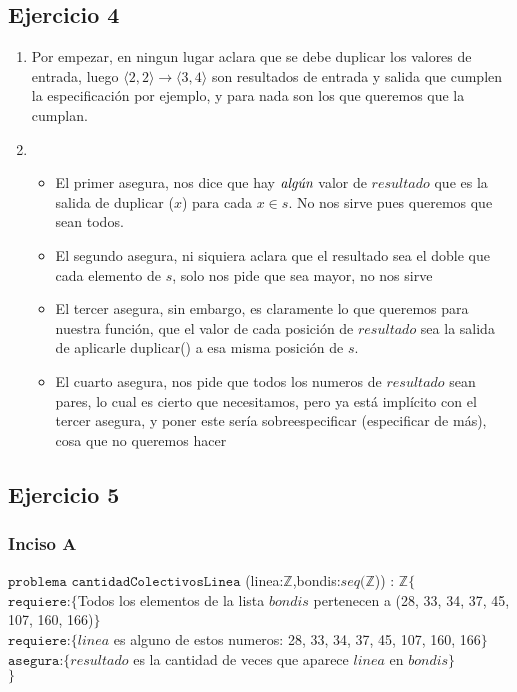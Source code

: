 	\subsection{Ejercicio 4}
	\begin{enumerate}[label=(\alph*)]
	\item Por empezar, en ningun lugar aclara que se debe duplicar los valores de entrada, luego $\langle 2,2 \rangle \rightarrow \langle 3,4 \rangle$ son resultados de entrada y salida que cumplen la especificación por ejemplo, y para nada son los que queremos que la cumplan.
	\item 
	\begin{itemize}
		\item El primer asegura, nos dice que hay $\emph{algún}$ valor de $resultado$ que es la salida de duplicar ($x$) para cada $x\in s$. No nos sirve pues queremos que sean todos.
		\item El segundo asegura, ni siquiera aclara que el resultado sea el doble que cada elemento de $s$, solo nos pide que sea mayor, no nos sirve
		\item El tercer asegura, sin embargo, es claramente lo que queremos para nuestra función, que el valor de cada posición de $resultado$ sea la salida de aplicarle duplicar() a esa misma posición de $s$.
		\item El cuarto asegura, nos pide que todos los numeros de $resultado$ sean pares, lo cual es cierto que necesitamos, pero ya está implícito con el tercer asegura, y poner este sería sobreespecificar (especificar de más), cosa que no queremos hacer
	\end{itemize}
	\end{enumerate}
	
	\subsection{Ejercicio 5}
	\subsubsection{Inciso A}
	$\texttt{problema cantidadColectivosLinea}$ (linea:$\mathbb{Z}$,bondis:$seq(\mathbb{Z}$)) : $\mathbb{Z}\lbrace$ \\
	$\texttt{requiere}$:$\lbrace$Todos los elementos de la lista $bondis$ pertenecen a (28, 33, 34, 37, 45, 107, 160, 166)$\rbrace$\\
	$\texttt{requiere}$:$\lbrace$$linea$ es alguno de estos numeros: 28, 33, 34, 37, 45, 107, 160, 166$\rbrace$\\
	$\texttt{asegura}$:$\lbrace$$resultado$ es la cantidad de veces que aparece $linea$ en $bondis$$\rbrace$\\
	$\rbrace$

